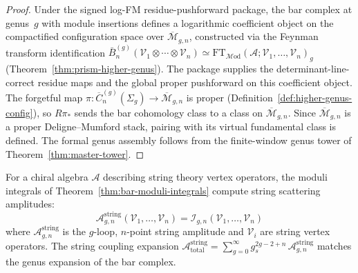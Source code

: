 \begin{proof}
Under the signed log-FM residue-pushforward package, the bar complex at
genus~$g$ with module insertions defines a logarithmic coefficient
object on the compactified configuration space over
$\overline{\mathcal{M}}_{g,n}$, constructed via the Feynman transform
identification
$\bar{B}^{(g)}_n(\mathcal{V}_1 \otimes \cdots \otimes \mathcal{V}_n)
\simeq
\mathrm{FT}_{\mathcal{M}\mathrm{od}}(\mathcal{A};
\mathcal{V}_1,\ldots,\mathcal{V}_n)_g$
(Theorem~\ref{thm:prism-higher-genus}).  The package supplies the
determinant-line-correct residue maps and the global proper pushforward
on this coefficient object. The forgetful map
$\pi\colon \overline{C}_n^{(g)}(\Sigma_g)\to
\overline{\mathcal{M}}_{g,n}$ is proper
(Definition~\ref{def:higher-genus-config}), so
$R\pi_*$ sends the bar cohomology class to a class on
$\overline{\mathcal{M}}_{g,n}$.  Since
$\overline{\mathcal{M}}_{g,n}$ is a proper Deligne--Mumford stack,
pairing with its virtual fundamental class is defined.  The formal
genus assembly follows from the finite-window genus tower of
Theorem~\ref{thm:master-tower}.
\end{proof}

\begin{conjecture}[String amplitude = bar complex cohomology; \ClaimStatusConjectured]\label{conj:string-amplitude-bar}
For a chiral algebra $\mathcal{A}$ describing string theory vertex operators, the moduli integrals of Theorem~\ref{thm:bar-moduli-integrals} compute string scattering amplitudes:
\[\mathcal{A}_{g,n}^{\mathrm{string}}(\mathcal{V}_1,\ldots,\mathcal{V}_n) = \mathcal{I}_{g,n}(\mathcal{V}_1,\ldots,\mathcal{V}_n)\]
where $\mathcal{A}_{g,n}^{\mathrm{string}}$ is the $g$-loop, $n$-point string amplitude and $\mathcal{V}_i$ are string vertex operators. The string coupling expansion $\mathcal{A}^{\mathrm{string}}_{\mathrm{total}} = \sum_{g=0}^\infty g_s^{2g-2+n}\, \mathcal{A}_{g,n}^{\mathrm{string}}$ matches the genus expansion of the bar complex.
\end{conjecture}

